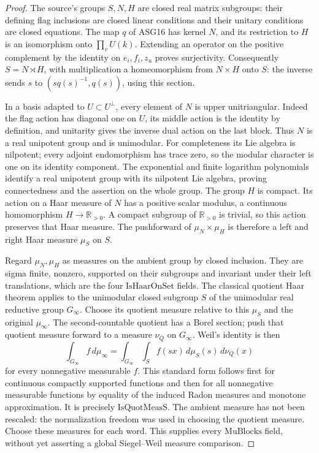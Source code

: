 \begin{proof}
The source's groups \(S,N,H\) are closed real matrix subgroups:
their defining flag inclusions are closed linear conditions and their
unitary conditions are closed equations.  The map \(q\) of ASG16
has kernel \(N\), and its restriction to \(H\) is an isomorphism
onto \(\prod_v U(k)\).  Extending an operator on the positive
complement by the identity on \(e_i,f_i,z_u\) proves surjectivity.
Consequently \(S=N\rtimes H\), with multiplication a homeomorphism
from \(N\times H\) onto \(S\): the inverse sends \(s\) to
\((s q(s)^{-1},q(s))\), using this section.

In a basis adapted to \(U\subset U^\perp\), every element of
\(N\) is upper unitriangular.  Indeed the flag action has diagonal
one on \(U\), its middle action is the identity by definition,
and unitarity gives the inverse dual action on the last block.
Thus \(N\) is a real unipotent group and is unimodular.
For completeness its Lie algebra is nilpotent; every adjoint
endomorphism has trace zero, so the modular character is one on its
identity component.  The exponential and finite logarithm polynomials
identify a real unipotent group with its nilpotent Lie algebra, proving
connectedness and the assertion on the whole group.
The group \(H\) is compact.  Its action on a Haar measure of \(N\)
has a positive scalar modulus, a continuous homomorphism
\(H\to\mathbb R_{>0}\).  A compact subgroup of
\(\mathbb R_{>0}\) is trivial, so this action preserves that Haar
measure.  The pushforward of \(\mu_N\times\mu_H\) is therefore
a left and right Haar measure \(\mu_S\) on \(S\).

Regard \(\mu_N,\mu_H\) as measures on the ambient group by
closed inclusion.  They are sigma finite, nonzero, supported on their
subgroups and invariant under their left translations, which are the
four \(\mathrm{IsHaarOnSet}\) fields.
The classical quotient Haar theorem applies to the unimodular closed
subgroup \(S\) of the unimodular real reductive group \(G_\infty\).
Choose its quotient measure relative to this \(\mu_S\) and the
original \(\mu_\infty\).  The second-countable quotient has a
Borel section; push that quotient measure forward to a measure
\(\nu_Q\) on \(G_\infty\).  Weil's identity is then
\[
 \int_{G_\infty} f\,d\mu_\infty
       =\int_{G_\infty}\int_S f(sx)\,d\mu_S(s)\,d\nu_Q(x)
\tag{ASG.14}
\]
for every nonnegative measurable \(f\).  This standard form follows
first for continuous compactly supported functions and then for all
nonnegative measurable functions by equality of the induced Radon
measures and monotone approximation.  It is precisely
\(\mathrm{IsQuotMeasS}\).  The ambient measure has not been
rescaled: the normalization freedom was used in choosing the quotient
measure.  Choose these measures for each word.  This supplies every
\(\mathrm{MuBlocks}\) field, without yet asserting a global
Siegel--Weil measure comparison.
\end{proof}

